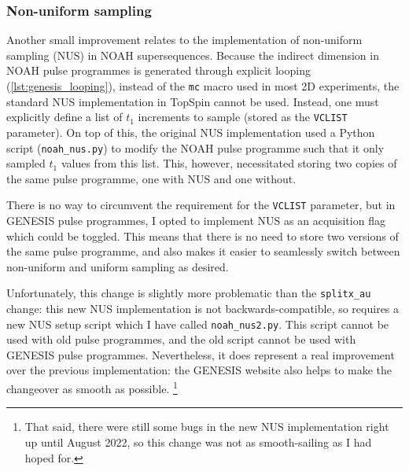 \subsubsection{Non-uniform sampling}

Another small improvement relates to the implementation of non-uniform sampling (NUS) in NOAH supersequences.
Because the indirect dimension in NOAH pulse programmes is generated through explicit looping (\cref{lst:genesis_looping}), instead of the \texttt{mc} macro used in most 2D experiments, the standard NUS implementation in TopSpin cannot be used.
Instead, one must explicitly define a list of $t_1$ increments to sample (stored as the \texttt{VCLIST} parameter).
On top of this, the original NUS implementation\autocite{Claridge2019MRC} used a Python script (\texttt{noah\_nus.py}) to modify the NOAH pulse programme such that it only sampled $t_1$ values from this list.
This, however, necessitated storing two copies of the same pulse programme, one with NUS and one without.

There is no way to circumvent the requirement for the \texttt{VCLIST} parameter, but in GENESIS pulse programmes, I opted to implement NUS as an acquisition flag which could be toggled.
This means that there is no need to store two versions of the same pulse programme, and also makes it easier to seamlessly switch between non-uniform and uniform sampling as desired.

Unfortunately, this change is slightly more problematic than the \texttt{splitx\_au} change: this new NUS implementation is not backwards-compatible, so requires a new NUS setup script which I have called \texttt{noah\_nus2.py}.
This script cannot be used with old pulse programmes, and the old script cannot be used with GENESIS pulse programmes.
Nevertheless, it does represent a real improvement over the previous implementation: the GENESIS website also helps to make the changeover as smooth as possible.%
\footnote{That said, there were still some bugs in the new NUS implementation right up until August 2022, so this change was not as smooth-sailing as I had hoped for.}
